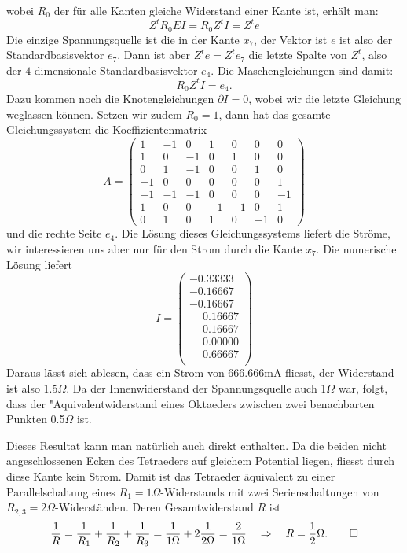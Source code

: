 \begin{loesung}
wobei $R_0$ der für alle Kanten gleiche Widerstand einer Kante ist,
erhält man:
\[
Z^tR_0EI=R_0Z^tI=Z^te
\]
Die einzige Spannungsquelle ist die in der Kante $x_7$, der Vektor
ist $e$ ist also der Standardbasisvektor $e_7$. Dann ist aber
$Z^te=Z^te_7$ die letzte Spalte von $Z^t$, also der $4$-dimensionale
Standardbasisvektor $e_4$. Die Maschengleichungen sind damit:
\[
R_0Z^tI=e_4.
\]
Dazu kommen noch die Knotengleichungen $\partial I=0$, wobei wir die letzte
Gleichung weglassen können. Setzen wir zudem $R_0=1$, dann hat das
gesamte Gleichungssystem die Koeffizientenmatrix
\[
A=\begin{pmatrix}
 1&-1& 0& 1& 0& 0& 0\\
 1& 0&-1& 0& 1& 0& 0\\
 0& 1&-1& 0& 0& 1& 0\\
-1& 0& 0& 0& 0& 0& 1\\
-1&-1&-1& 0& 0& 0&-1\\
 1& 0& 0&-1&-1& 0& 1\\
 0& 1& 0& 1& 0&-1& 0
\end{pmatrix}
\]
%
%
und die rechte Seite $e_4$. Die Lösung dieses Gleichungssystems liefert die
Ströme, wir interessieren uns aber nur für den Strom durch die
Kante $x_7$. Die numerische Lösung liefert
\[
I=\begin{pmatrix}
          -0.33333\\
          -0.16667\\
          -0.16667\\
\phantom{-}0.16667\\
\phantom{-}0.16667\\
\phantom{-}0.00000\\
\phantom{-}0.66667\\
\end{pmatrix}
\]
Daraus lässt sich ablesen, dass ein Strom von 666.666mA fliesst,
der Widerstand ist also 1.5$\Omega$. Da der Innenwiderstand
der Spannungsquelle auch 1$\Omega$ war, folgt, dass der "Aquivalentwiderstand
eines Oktaeders zwischen zwei benachbarten Punkten 0.5$\Omega$ ist.

Dieses Resultat kann man natürlich auch direkt enthalten. Da die beiden
nicht angeschlossenen Ecken des Tetraeders auf gleichem Potential liegen,
fliesst durch diese Kante kein Strom. Damit ist das Tetraeder äquivalent
zu einer Parallelschaltung eines $R_1=1\Omega$-Widerstands mit zwei
Serienschaltungen von $R_{2,3}=2\Omega$-Widerständen.
Deren Gesamtwiderstand $R$
ist
\[
\frac1R=\frac1{R_1}+\frac1{R_2}+\frac1{R_3}=\frac1{1\Omega}+2\frac1{2\Omega}=\frac2{1\Omega}
\quad
\Rightarrow
\quad
R=\frac12\Omega.
\qedhere
\]
\end{loesung}

